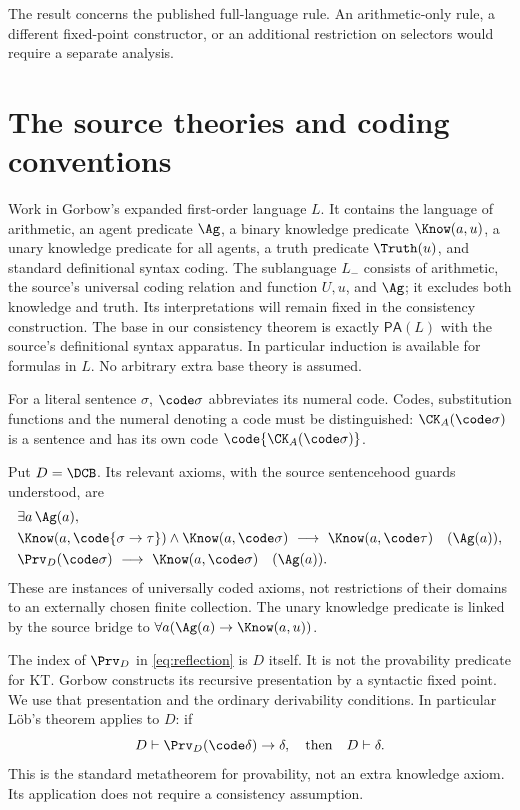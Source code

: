 \documentclass[11pt]{article}
\begin{document}
The result concerns the published full-language rule. An arithmetic-only
rule, a different fixed-point constructor, or an additional restriction
on selectors would require a separate analysis.

\section{The source theories and coding conventions}

Work in Gorbow's expanded first-order language $L$. It contains the
language of arithmetic, an agent predicate $\Ag$, a binary knowledge
predicate $\Know(a,u)$, a unary knowledge predicate for all agents,
a truth predicate $\Truth(u)$, and standard definitional syntax coding.
The sublanguage $L_-$ consists of arithmetic, the source's universal
coding relation and function $U,u$, and $\Ag$; it excludes both knowledge
and truth. Its interpretations will remain fixed in the consistency
construction.
The base in our consistency theorem is exactly $\mathsf{PA}(L)$ with
the source's definitional syntax apparatus. In particular induction is
available for formulas in $L$. No arbitrary extra base theory is assumed.

For a literal sentence $\sigma$, $\code\sigma$ abbreviates its numeral
code. Codes, substitution functions and the numeral denoting a code
must be distinguished: $\CK_A(\code\sigma)$ is a sentence and has its
own code $\code{\CK_A(\code\sigma)}$.

Put $D=\DCB$. Its relevant axioms, with the source sentencehood guards
understood, are
\begin{align}
 &\exists a\,\Ag(a),\label{eq:nonempty}\\
 &\Know(a,\code{\sigma\to\tau})\wedge\Know(a,\code\sigma)
       \ \longrightarrow\ \Know(a,\code\tau)
       \quad(\Ag(a)),\label{eq:distribution}\\
 &\Prv_D(\code\sigma)\ \longrightarrow\ \Know(a,\code\sigma)
       \quad(\Ag(a)).\label{eq:reflection}
\end{align}
These are instances of universally coded axioms, not restrictions of
their domains to an externally chosen finite collection. The unary
knowledge predicate is linked by the source bridge to
$\forall a(\Ag(a)\to\Know(a,u))$.

The index of $\Prv_D$ in \eqref{eq:reflection} is $D$ itself.
It is not the provability predicate for KT. Gorbow constructs its
recursive presentation by a syntactic fixed point. We use that
presentation and the ordinary derivability conditions. In particular
L\"ob's theorem applies to $D$: if
\[
 D\vdash\Prv_D(\code\delta)\to\delta,
 \quad\text{then}\quad D\vdash\delta.
\]
This is the standard metatheorem for provability, not an extra
knowledge axiom. Its application does not require a consistency
assumption.
\end{document}
